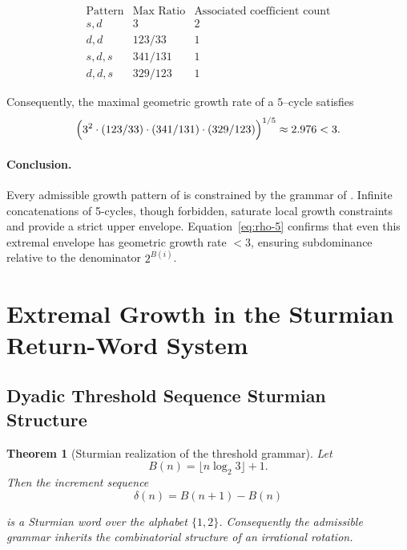 \documentclass[12pt, oneside]{article}
\numberwithin{equation}{section}
\theoremstyle{definition}
\theoremstyle{plain}
\newtheorem{theorem}{Theorem}[section]
\theoremstyle{remark}
\begin{document}
\[
\begin{array}{c|c|c}
\text{Pattern} & \text{Max Ratio} & \text{Associated coefficient count} \\
\hline
s,d & 3 & 2 \\
d,d & 123/33 & 1 \\
s,d,s & 341/131 & 1 \\
d,d,s & 329/123 & 1
\end{array}
\]

Consequently, the maximal geometric growth rate of a $5$--cycle satisfies
\begin{equation}
\Bigl(
3^2 \cdot (123/33) \cdot (341/131) \cdot (329/123)
\Bigr)^{1/5} 
\approx 2.976 < 3.
\label{eq:rho-5}
\end{equation}

\paragraph{Conclusion.}
Every admissible growth pattern of  is constrained by the grammar
of . Infinite concatenations of 5-cycles, though forbidden, saturate
local growth constraints and provide a strict upper envelope. Equation~\eqref{eq:rho-5}
confirms that even this extremal envelope has geometric growth rate $< 3$, ensuring
subdominance relative to the denominator $2^{B(i)}$.


\section{Extremal Growth in the Sturmian Return-Word System}
\label{app:sturmian}

\subsection{Dyadic Threshold Sequence Sturmian Structure}

\begin{theorem}[Sturmian realization of the threshold grammar]
Let
\[
B(n)=\lfloor n\log_2 3\rfloor+1.
\]
Then the increment sequence
\[
\delta(n)=B(n+1)-B(n)
\]

is a Sturmian word over the alphabet \(\{1,2\}\).
Consequently the admissible grammar inherits the combinatorial
structure of an irrational rotation.
\end{theorem}
\end{document}
